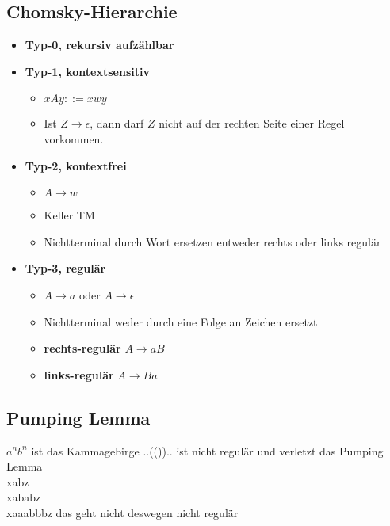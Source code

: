\subsection{Chomsky-Hierarchie}
\begin{itemize}
  \item [] \textbf{Typ-0, rekursiv aufzählbar}
  \item [] \textbf{Typ-1, kontextsensitiv}
  \begin{itemize}
    \item [] $xAy::=xwy$
    \item [] Ist $Z \longrightarrow \epsilon$, dann darf $Z$ nicht auf der rechten Seite einer Regel vorkommen.
  \end{itemize}
  \item [] \textbf{Typ-2, kontextfrei}
  \begin{itemize}
    \item []$A \longrightarrow w$
    \item [] Keller TM
    \item [] Nichtterminal durch Wort ersetzen entweder rechts oder links regulär
  \end{itemize}
  \item [] \textbf{Typ-3, regulär}
  \begin{itemize}
    \item [] $A \longrightarrow a$ oder $A \longrightarrow \epsilon $
    \item [] Nichtterminal weder durch eine Folge an Zeichen ersetzt
    \item [] \textbf{rechts-regulär} $A \longrightarrow aB$
    \item [] \textbf{links-regulär} $A \longrightarrow Ba$
  \end{itemize}
\end{itemize}
\subsection{Pumping Lemma}
$a^nb^n$ ist das Kammagebirge ..(()).. ist nicht regulär und verletzt das Pumping Lemma\\
xabz\\
xababz \\
xaaabbbz das geht nicht deswegen nicht regulär